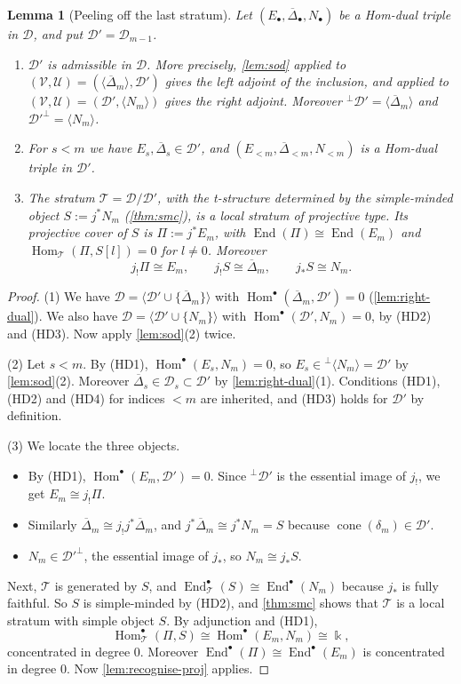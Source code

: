 \documentclass[11pt,reqno]{amsart}
\theoremstyle{plain}
\newtheorem{lemma}[theorem]{Lemma}
\theoremstyle{definition}
\theoremstyle{remark}
\newcommand{\kk}{\Bbbk}
\DeclareMathOperator{\Hom}{Hom}
\DeclareMathOperator{\End}{End}
\DeclareMathOperator{\cone}{cone}
\newcommand{\thick}[1]{\langle #1\rangle}
\newcommand{\Deltabar}{\overline{\Delta}}
\newcommand{\cD}{\mathcal{D}}
\newcommand{\cT}{\mathcal{T}}
\newcommand{\cU}{\mathcal{U}}
\newcommand{\cV}{\mathcal{V}}
\begin{document}
\begin{lemma}[Peeling off the last stratum]\label{lem:peel}
Let $(E_\bullet,\Deltabar_\bullet,N_\bullet)$ be a Hom-dual triple in $\cD$, and put $\cD'=\cD_{m-1}$.
\begin{enumerate}
\item $\cD'$ is admissible in $\cD$. More precisely, \cref{lem:sod} applied to $(\cV,\cU)=(\thick{\Deltabar_m},\cD')$ gives the left adjoint of the inclusion, and applied to $(\cV,\cU)=(\cD',\thick{N_m})$ gives the right adjoint. Moreover ${}^\perp\cD'=\thick{\Deltabar_m}$ and $\cD'^\perp=\thick{N_m}$.
\item For $s<m$ we have $E_s,\Deltabar_s\in\cD'$, and $(E_{<m},\Deltabar_{<m},N_{<m})$ is a Hom-dual triple in $\cD'$.
\item The stratum $\cT=\cD/\cD'$, with the t-structure determined by the simple-minded object $S:=j^*N_m$ (\cref{thm:smc}), is a local stratum of projective type. Its projective cover of $S$ is $\Pi:=j^*E_m$, with $\End(\Pi)\cong\End(E_m)$ and $\Hom_\cT(\Pi,S[l])=0$ for $l\neq0$. Moreover
\[j_!\Pi\cong E_m,\qquad j_!S\cong\Deltabar_m,\qquad j_*S\cong N_m.\]
\end{enumerate}
\end{lemma}

\begin{proof}
(1) We have $\cD=\thick{\cD'\cup\{\Deltabar_m\}}$ with $\Hom^\bullet(\Deltabar_m,\cD')=0$ (\cref{lem:right-dual}). We also have $\cD=\thick{\cD'\cup\{N_m\}}$ with $\Hom^\bullet(\cD',N_m)=0$, by (HD2) and (HD3). Now apply \cref{lem:sod}(2) twice.

(2) Let $s<m$. By (HD1), $\Hom^\bullet(E_s,N_m)=0$, so $E_s\in{}^\perp\thick{N_m}=\cD'$ by \cref{lem:sod}(2). Moreover $\Deltabar_s\in\cD_s\subset\cD'$ by \cref{lem:right-dual}(1). Conditions (HD1), (HD2) and (HD4) for indices $<m$ are inherited, and (HD3) holds for $\cD'$ by definition.

(3) We locate the three objects.
\begin{itemize}
\item By (HD1), $\Hom^\bullet(E_m,\cD')=0$. Since ${}^\perp\cD'$ is the essential image of $j_!$, we get $E_m\cong j_!\Pi$.
\item Similarly $\Deltabar_m\cong j_!j^*\Deltabar_m$, and $j^*\Deltabar_m\cong j^*N_m=S$ because $\cone(\delta_m)\in\cD'$.
\item $N_m\in\cD'^\perp$, the essential image of $j_*$, so $N_m\cong j_*S$.
\end{itemize}
Next, $\cT$ is generated by $S$, and $\End^\bullet_\cT(S)\cong\End^\bullet(N_m)$ because $j_*$ is fully faithful. So $S$ is simple-minded by (HD2), and \cref{thm:smc} shows that $\cT$ is a local stratum with simple object $S$. By adjunction and (HD1),
\[\Hom^\bullet_\cT(\Pi,S)\cong\Hom^\bullet(E_m,N_m)\cong\kk,\]
concentrated in degree $0$. Moreover $\End^\bullet(\Pi)\cong\End^\bullet(E_m)$ is concentrated in degree $0$. Now \cref{lem:recognise-proj} applies.
\end{proof}
\end{document}
